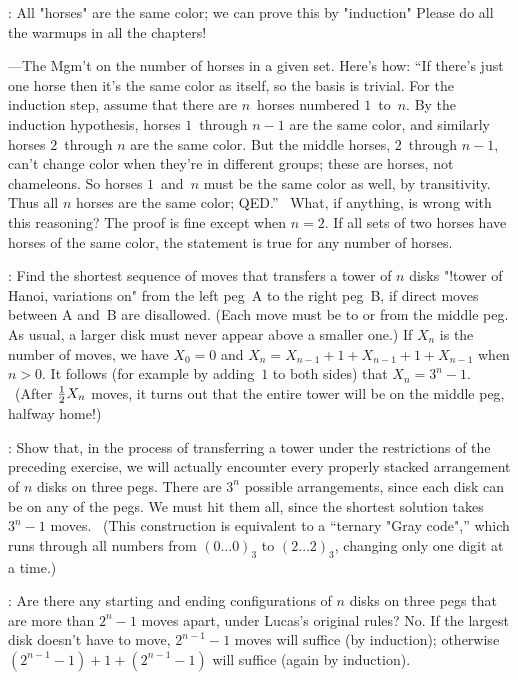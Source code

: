 \ex:
All "horses" are the same color; we can prove this by "induction"
\g Please do all the warmups in all the chapters!\par
\hfill\dash---The Mgm't\g
on the number of horses in a given set. Here's how:
``If there's just one horse then it's the same color as itself,
so the basis is trivial.
For the induction step,
assume that there are $n$~horses numbered $1$~to~$n$.
By the induc\-tion hypothesis, horses
$1$~through $n-1$ are the same color,
and similarly horses $2$~through $n$ are the same color.
But the middle horses, $2$~through $n-1$, can't change color
when they're in different groups;
these are horses, not chameleons.
So horses $1$~and~$n$ must be
the same color as well, by transitivity.
Thus all $n$ horses are the same color; QED.'' \
What, if anything, is wrong with this reasoning?
\answer The proof is fine except when $n=2$. If all sets of two horses
have horses of the same color, the statement is true for any number of horses.
\source{"P\'olya" [|polya|, p.~120].}

\ex:
Find the shortest sequence of moves that transfers a tower of $n$ disks
"!tower of Hanoi, variations on"
from the left peg~A to the right peg~B, if direct moves
between A and~B are dis\-allowed. (Each
move must be to or from the middle peg. As usual, a larger disk
must never appear above a smaller one.)
\answer If $X_n$ is the number of moves, we have $X_0=0$ and
$X_n=X_{n-1}+1+X_{n-1}+1+X_{n-1}$ when $n>0$. It follows (for example
by adding~$1$ to both sides) that $X_n=3^n-1$.
\ (After ${1\over2} X_n$ moves, it turns out that the entire tower will
be on the middle peg, halfway home!)

\ex: 
Show that, in the process of transferring a tower under the restrictions
of the preceding exercise, we will actually encounter
every properly stacked arrangement of $n$ disks on three pegs.
\answer There are $3^n$ possible arrangements, since each disk can be
on any of the pegs. We must hit them all, since the shortest solution
takes $3^n-1$ moves. \ (This construction is equivalent to a
``ternary "Gray code",\qback'' which runs through all numbers
from $(0\ldots0)_3$ to $(2\ldots2)_3$,
changing only one digit at a time.)

\ex:
Are there any starting and ending configurations of $n$ disks on three
pegs that are more than $2^n-1$ moves apart, under Lucas's original rules?
\answer No. If the largest disk doesn't have to move, $2^{n-1}-1$ moves
will suffice (by induction); otherwise $(2^{n-1}-1)+1+(2^{n-1}-1)$ will
suffice (again by induction).

